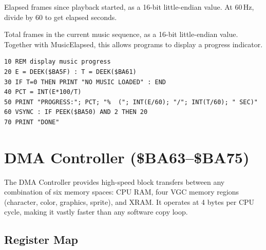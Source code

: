 Elapsed frames since playback started, as a 16-bit little-endian value.
At 60\,Hz, divide by 60 to get elapsed seconds.



Total frames in the current music sequence, as a 16-bit little-endian
value.  Together with MusicElapsed, this allows programs to display a
progress indicator.

\begin{lstlisting}
10 REM display music progress
20 E = DEEK($BA5F) : T = DEEK($BA61)
30 IF T=0 THEN PRINT "NO MUSIC LOADED" : END
40 PCT = INT(E*100/T)
50 PRINT "PROGRESS:"; PCT; "%  ("; INT(E/60); "/"; INT(T/60); " SEC)"
60 VSYNC : IF PEEK($BA50) AND 2 THEN 20
70 PRINT "DONE"
\end{lstlisting}


\section{DMA Controller (\$BA63--\$BA75)}
\label{sec:dma}

The DMA Controller provides high-speed block transfers between any
combination of six memory spaces: CPU RAM, four VGC memory regions
(character, color, graphics, sprite), and XRAM.  It operates at 4 bytes
per CPU cycle, making it vastly faster than any software copy loop.

\subsection{Register Map}

